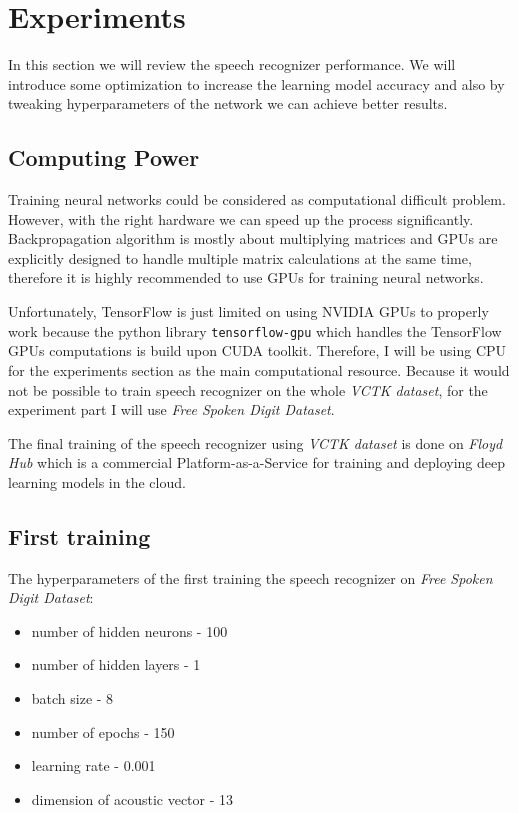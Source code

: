 \chapter{Experiments}

In this section we will review the speech recognizer performance.
We will introduce some optimization to increase the learning model accuracy and also by tweaking hyperparameters of the network we can achieve better results.

\section{Computing Power}

Training neural networks could be considered as computational difficult problem.
However, with the right hardware we can speed up the process significantly.
Backpropagation algorithm is mostly about multiplying matrices and GPUs are explicitly designed to handle multiple matrix calculations at the same time, therefore it is highly recommended to use GPUs for training neural networks.

Unfortunately, TensorFlow is just limited on using NVIDIA GPUs to properly work because the python library \texttt{tensorflow-gpu} which handles the TensorFlow GPUs computations is build upon CUDA toolkit.
Therefore, I will be using CPU for the experiments section as the main computational resource.
Because it would not be possible to train speech recognizer on the whole \textit{VCTK dataset}, for the experiment part I will use \textit{Free Spoken Digit Dataset}.

The final training of the speech recognizer using \textit{VCTK dataset} is done on \textit{Floyd Hub} which is a commercial Platform-as-a-Service for training and deploying deep learning models in the cloud.

\section{First training}

The hyperparameters of the first training the speech recognizer on \textit{Free Spoken Digit Dataset}:

\begin{itemize}
	\item number of hidden neurons - 100
	\item number of hidden layers - 1
	\item batch size - 8
	\item number of epochs - 150
  \item learning rate - 0.001
	\item dimension of acoustic vector - 13
\end{itemize}

